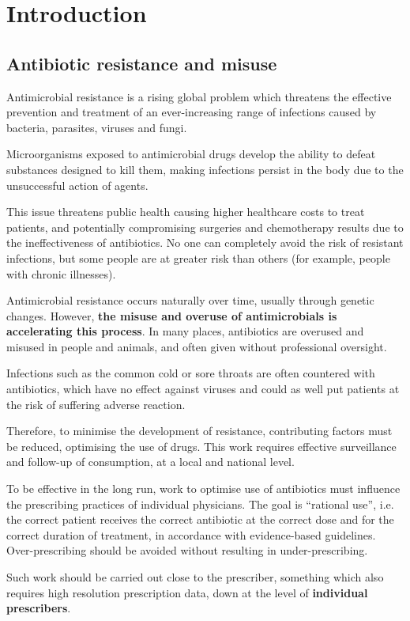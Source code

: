 \chapter{Introduction}
\section{Antibiotic resistance and misuse}
Antimicrobial resistance is a rising global problem which threatens the effective prevention and treatment of an ever-increasing range of infections caused by bacteria, parasites, viruses and fungi\cite{who}. 

Microorganisms exposed to antimicrobial drugs develop the ability to defeat substances designed to kill them, making infections persist in the body due to the unsuccessful action of agents.

This issue threatens public health causing higher healthcare costs to treat patients, and potentially compromising surgeries and chemotherapy results due to the ineffectiveness of antibiotics. No one can completely avoid the risk of resistant infections, but some people are at greater risk than others (for example, people with chronic illnesses)\cite{cdc}.

Antimicrobial resistance occurs naturally over time, usually through genetic changes. However, \textbf{the misuse and overuse of antimicrobials is accelerating this process}. In many places, antibiotics are overused and misused in people and animals, and often given without professional oversight\cite{who}.

Infections such as the common cold or sore throats are often countered with antibiotics, which have no effect against viruses and could as well put patients at the risk of suffering adverse reaction\cite{bmj}.

Therefore, to minimise the development of resistance, contributing factors must be reduced, optimising the use of drugs. This work requires effective surveillance and follow-up of consumption, at a local and national level. 

To be effective in the long run, work to optimise use of antibiotics must influence the prescribing practices of individual physicians. The goal is “rational use”, i.e. the correct patient receives the correct antibiotic at the correct dose and for the correct duration of treatment, in accordance with evidence-based guidelines. Over-prescribing should be avoided without resulting in under-prescribing\cite{sweden}.

Such work should be carried out close to the prescriber, something which also requires high resolution prescription data, down at the level of \textbf{individual prescribers}.

